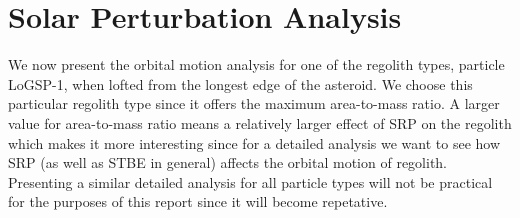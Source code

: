 \section{Solar Perturbation Analysis}
\label{sec:LoGSP-1}
We now present the orbital motion analysis for one of the regolith types, particle LoGSP-1, when lofted from the longest edge of the asteroid. We choose this particular regolith type since it offers the maximum area-to-mass ratio. A larger value for area-to-mass ratio means a relatively larger effect of \gls{SRP} on the regolith which makes it more interesting since for a detailed analysis we want to see how \gls{SRP} (as well as \gls{STBE} in general) affects the orbital motion of regolith. Presenting a similar detailed analysis for all particle types will not be practical for the purposes of this report since it will become repetative.

